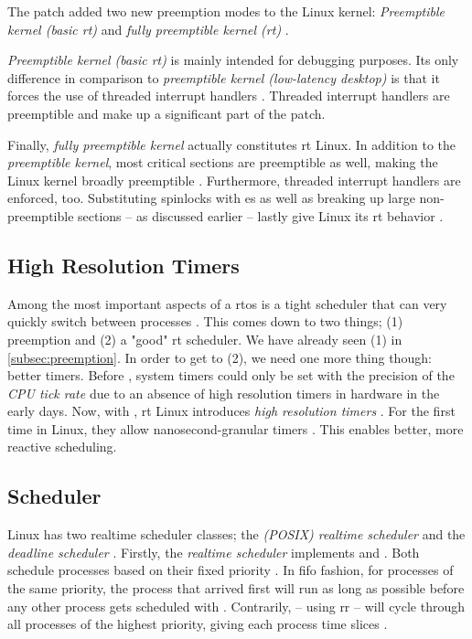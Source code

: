 \documentclass[10pt,twocolumn,a4paper]{article}
\begin{document}
\noindent The  patch added two new preemption modes to the Linux kernel:
\emph{Preemptible kernel (basic \acrshort{rt})} and \emph{fully preemptible kernel (\acrshort{rt})} \cite{lf:preemption}.

\emph{Preemptible kernel (basic \acrshort{rt})} is mainly intended for debugging purposes.
Its only difference in comparison to \emph{preemptible kernel (low-latency desktop)} is that it forces the use of threaded interrupt handlers \cite{lf:preemption}.
Threaded interrupt handlers are preemptible and make up a significant part of the  patch.

Finally, \emph{fully preemptible kernel} actually constitutes \acrshort{rt} Linux.
In addition to the \emph{preemptible kernel}, most critical sections are preemptible as well, making the Linux kernel broadly preemptible \cite{lf:preemption}.
Furthermore, threaded interrupt handlers are enforced, too.
Substituting spinlocks with es as well as breaking up large non-preemptible sections -- as discussed earlier -- lastly give Linux its \acrshort{rt} behavior \cite{lf:preemption}.

\subsection{High Resolution Timers}\label{subsec:hr-timers}
Among the most important aspects of a \acrshort{rtos} is a tight scheduler that can very quickly switch between processes \cite{reghenzani_realtime_2019}.
This comes down to two things; (1) preemption and (2) a "good" \acrshort{rt} scheduler.
We have already seen (1) in \autoref{subsec:preemption}.
In order to get to (2), we need one more thing though: better timers.
Before , system timers could only be set with the precision of the \emph{CPU tick rate} \cite{reghenzani_realtime_2019} due to an absence of high resolution timers in hardware in the early days.
Now, with , \acrshort{rt} Linux introduces \emph{high resolution timers} \cite{lf:timers}.
For the first time in Linux, they allow nanosecond-granular timers \cite{reghenzani_realtime_2019}.
This enables better, more reactive scheduling.

\subsection{Scheduler}\label{subsec:scheduler}
Linux has two realtime scheduler classes; the \emph{(POSIX) realtime scheduler} and the \emph{deadline scheduler} \cite{bristot_de_oliveira_deadline_2018}.
Firstly, the \emph{realtime scheduler} implements  and  \cite{lf:scheduler}.
Both schedule processes based on their fixed priority \cite{lf:scheduler,de_oliveira_timing_2016}.
In \acrfull{fifo} fashion, for processes of the same priority, the process that arrived first will run as long as possible before any other process gets scheduled with .
Contrarily,  -- using \acrfull{rr} -- will cycle through all processes of the highest priority, giving each process time slices \cite{bristot_de_oliveira_deadline_2018}.
\end{document}

